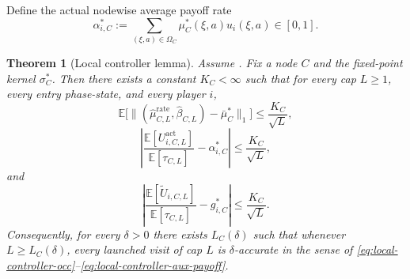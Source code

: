 \documentclass[12pt]{article}
\newtheorem{theorem}{Theorem}[section]
\theoremstyle{definition}
\newcommand{\E}{\mathbb{E}}
\newcommand{\1}{\mathbf{1}}
\begin{document}
Define the actual nodewise average payoff rate
\begin{equation}
\label{eq:alpha-node}
\alpha_{i,C}^*
:=
\sum_{(\xi,a)\in\Omega_C}\mu_C^*(\xi,a)u_i(\xi,a)\in[0,1].
\end{equation}

\begin{theorem}[Local controller lemma]
\label{thm:local-controller}
Assume . Fix a node $C$ and the fixed-point kernel
$\sigma_C^*$. Then there exists a constant $K_C<\infty$ such that for every cap
$L\ge 1$, every entry phase-state, and every player $i$,
\begin{equation}
\label{eq:local-controller-occ}
\E\bigl[\|(\widehat\mu_{C,L}^{\mathrm{rate}},\widehat\beta_{C,L})-\bar\mu_C^*\|_1\bigr]
\le \frac{K_C}{\sqrt L},
\end{equation}
\begin{equation}
\label{eq:local-controller-actual-payoff}
\left|
\frac{\E[U_{i,C,L}^{\mathrm{act}}]}{\E[\tau_{C,L}]}
-
\alpha_{i,C}^*
\right|
\le \frac{K_C}{\sqrt L},
\end{equation}
and
\begin{equation}
\label{eq:local-controller-aux-payoff}
\left|
\frac{\E[\widetilde U_{i,C,L}]}{\E[\tau_{C,L}]}
-
g_{i,C}^*
\right|
\le \frac{K_C}{\sqrt L}.
\end{equation}
Consequently, for every $\delta>0$ there exists $L_C(\delta)$ such that whenever
$L\ge L_C(\delta)$, every launched visit of cap $L$ is $\delta$-accurate in the
sense of \eqref{eq:local-controller-occ}--\eqref{eq:local-controller-aux-payoff}.
\end{theorem}
\end{document}
